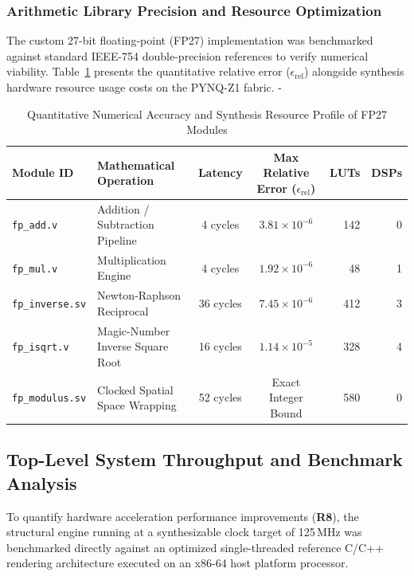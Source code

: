\subsubsection{Arithmetic Library Precision and Resource Optimization}
The custom 27-bit floating-point (FP27) implementation was benchmarked against standard IEEE-754 double-precision references to verify numerical viability. Table~\ref{tab:fp27_evaluation} presents the quantitative relative error ($\epsilon_{\text{rel}}$) alongside synthesis hardware resource usage costs on the PYNQ-Z1 fabric.
-
\begin{table}[htbp]
\centering
\small
\renewcommand{\arraystretch}{1.2}
\caption{Quantitative Numerical Accuracy and Synthesis Resource Profile of FP27 Modules}
\label{tab:fp27_evaluation}
\begin{tabularx}{\textwidth}{l|l|c|c|r|r}
\toprule
\textbf{Module ID} & \textbf{Mathematical Operation} & \textbf{Latency} & \textbf{Max Relative Error ($\epsilon_{\text{rel}}$)} & \textbf{LUTs} & \textbf{DSPs} \\ 
\midrule
\texttt{fp\_add.v}     & Addition / Subtraction Pipeline & 4 cycles   & $3.81 \times 10^{-6}$ & 142 & 0 \\ 
\texttt{fp\_mul.v}     & Multiplication Engine           & 4 cycles   & $1.92 \times 10^{-6}$ & 48  & 1 \\ 
\texttt{fp\_inverse.sv} & Newton-Raphson Reciprocal       & 36 cycles  & $7.45 \times 10^{-6}$ & 412 & 3 \\ 
\texttt{fp\_isqrt.v}   & Magic-Number Inverse Square Root & 16 cycles  & $1.14 \times 10^{-5}$ & 328 & 4 \\ 
\texttt{fp\_modulus.sv} & Clocked Spatial Space Wrapping  & 52 cycles  & Exact Integer Bound   & 580 & 0 \\ 
\bottomrule
\end{tabularx}
\end{table}

\subsection{Top-Level System Throughput and Benchmark Analysis}
\label{sec:toplevel_throughput}
To quantify hardware acceleration performance improvements (\textbf{R8}), the structural engine running at a synthesizable clock target of 125\,MHz was benchmarked directly against an optimized single-threaded reference C/C++ rendering architecture executed on an x86-64 host platform processor.

